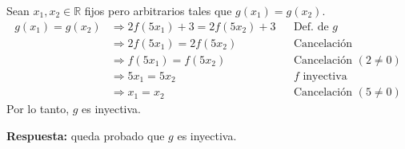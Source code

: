 \documentclass[11pt]{article}
\begin{document}
Sean $x_1,x_2\in\mathbb R$ fijos pero arbitrarios tales que $g(x_1)=g(x_2)$.
\begin{align*}
g(x_1)=g(x_2) &\Rightarrow 2f(5x_1)+3=2f(5x_2)+3 && \text{Def.\ de }g\\
&\Rightarrow 2f(5x_1)=2f(5x_2) && \text{Cancelación}\\
&\Rightarrow f(5x_1)=f(5x_2) && \text{Cancelación }(2\neq0)\\
&\Rightarrow 5x_1=5x_2 && f\text{ inyectiva}\\
&\Rightarrow x_1=x_2 && \text{Cancelación }(5\neq0)
\end{align*}
Por lo tanto, $g$ es inyectiva.

\textbf{Respuesta:} queda probado que $g$ es inyectiva.
\end{document}
